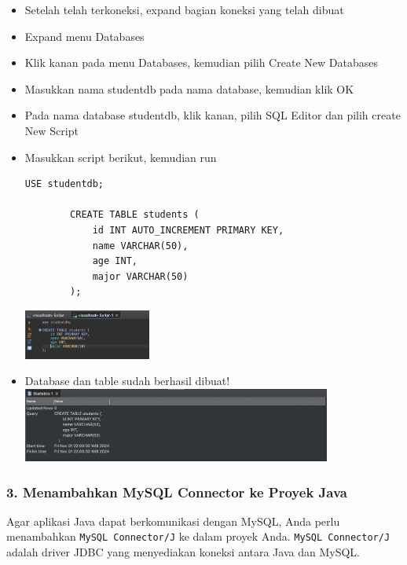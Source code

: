 \begin{itemize}
	\item Setelah telah terkoneksi, expand bagian koneksi yang telah dibuat 
	
	\item Expand menu Databases
	
	\item Klik kanan pada menu Databases, kemudian pilih Create New Databases
	
	\item Masukkan nama studentdb pada nama database, kemudian klik OK
	
	\item Pada nama database studentdb, klik kanan, pilih SQL Editor dan pilih create New Script
	
	\item Masukkan script berikut, kemudian run
	\begin{lstlisting}[style=JavaStyle]
		USE studentdb;
		
		CREATE TABLE students (
			id INT AUTO_INCREMENT PRIMARY KEY,
			name VARCHAR(50),
			age INT,
			major VARCHAR(50)
		);
	\end{lstlisting}
	\includegraphics[width=0.33\textwidth]{assets/pertemuan12/dbeaver-script-create-table.png}
	
	\item Database dan table sudah berhasil dibuat!\\
	\includegraphics[width=0.8\textwidth]{assets/pertemuan12/dbeaver-table-success-script.png}
	
\end{itemize}

\subsubsection{3. Menambahkan MySQL Connector ke Proyek Java}

Agar aplikasi Java dapat berkomunikasi dengan MySQL, Anda perlu menambahkan \texttt{MySQL Connector/J} ke dalam proyek Anda. \texttt{MySQL Connector/J} adalah driver JDBC yang menyediakan koneksi antara Java dan MySQL.

